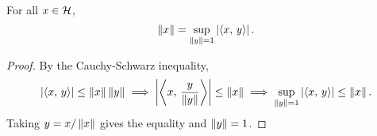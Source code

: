\begin{proposition}
    For all $x\in\H$, 
    \begin{equation*}
        \norm{x} = \sup_{\norm{y} = 1}\abs{\inprod{x}{y}}.
    \end{equation*}
\end{proposition}
\begin{proof}
    By the Cauchy-Schwarz inequality, 
    \begin{equation*}
        \abs{\inprod{x}{y}} \leq \norm{x}\norm{y} 
        \implies \abs{\inprod{x}{\frac{y}{\norm{y}}}} \leq \norm{x}
        \implies \sup_{\norm{y} = 1}\abs{\inprod{x}{y}} \leq \norm{x}.
    \end{equation*}
    Taking $y = x/\norm{x}$ gives the equality and $\norm{y} = 1$.
\end{proof}


